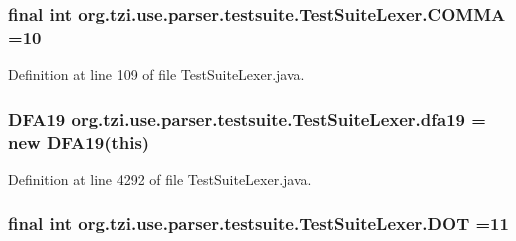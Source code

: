 \hypertarget{classorg_1_1tzi_1_1use_1_1parser_1_1testsuite_1_1_test_suite_lexer_a73a315ace9adf3e547e74450af1d8f28}{
\subsubsection[{C\-O\-M\-M\-A}]{\setlength{\rightskip}{0pt plus 5cm}final int org.\-tzi.\-use.\-parser.\-testsuite.\-Test\-Suite\-Lexer.\-C\-O\-M\-M\-A =10\hspace{0.3cm}{\ttfamily [static]}}}\label{classorg_1_1tzi_1_1use_1_1parser_1_1testsuite_1_1_test_suite_lexer_a73a315ace9adf3e547e74450af1d8f28}


Definition at line 109 of file Test\-Suite\-Lexer.\-java.

\hypertarget{classorg_1_1tzi_1_1use_1_1parser_1_1testsuite_1_1_test_suite_lexer_a4f9f0b9aaea2504f0a784d817788eaa0}{
\subsubsection[{dfa19}]{\setlength{\rightskip}{0pt plus 5cm}D\-F\-A19 org.\-tzi.\-use.\-parser.\-testsuite.\-Test\-Suite\-Lexer.\-dfa19 = new D\-F\-A19(this)\hspace{0.3cm}{\ttfamily [protected]}}}\label{classorg_1_1tzi_1_1use_1_1parser_1_1testsuite_1_1_test_suite_lexer_a4f9f0b9aaea2504f0a784d817788eaa0}


Definition at line 4292 of file Test\-Suite\-Lexer.\-java.

\hypertarget{classorg_1_1tzi_1_1use_1_1parser_1_1testsuite_1_1_test_suite_lexer_af0aeded010794462dcb387bb067ca7b3}{
\subsubsection[{D\-O\-T}]{\setlength{\rightskip}{0pt plus 5cm}final int org.\-tzi.\-use.\-parser.\-testsuite.\-Test\-Suite\-Lexer.\-D\-O\-T =11\hspace{0.3cm}{\ttfamily [static]}}}\label{classorg_1_1tzi_1_1use_1_1parser_1_1testsuite_1_1_test_suite_lexer_af0aeded010794462dcb387bb067ca7b3}


